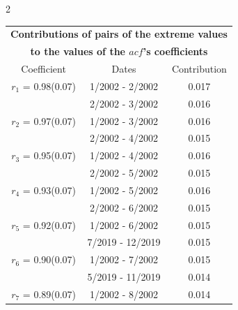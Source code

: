 
\thispagestyle{empty}
\begin{multicols}{2}{ 
\begin{tabular}{ccc}
\multicolumn{3}{c}{\textbf{Contributions of pairs of the extreme values} }  \vspace{-.10in}  \\ 
\multicolumn{3}{c}{ \textbf{to the values of the $acf$'s coefficients}} \\ 
\hline 
\hline                  Coefficient  &  Dates &  Contribution \\ 
\hline 
  $r_{ 1}$ = 0.98(0.07) &       1/2002 -  2/2002 &        0.017   \vspace{-.10in} \\  
&        2/2002 -  3/2002 &        0.016  \vspace{-.02in} \\ \hline 
  $r_{ 2}$ = 0.97(0.07) &       1/2002 -  3/2002 &        0.016   \vspace{-.10in} \\  
&        2/2002 -  4/2002 &        0.015  \vspace{-.02in} \\ \hline 
  $r_{ 3}$ = 0.95(0.07) &       1/2002 -  4/2002 &        0.016   \vspace{-.10in} \\  
&        2/2002 -  5/2002 &        0.015  \vspace{-.02in} \\ \hline 
  $r_{ 4}$ = 0.93(0.07) &       1/2002 -  5/2002 &        0.016   \vspace{-.10in} \\  
&        2/2002 -  6/2002 &        0.015  \vspace{-.02in} \\ \hline 
  $r_{ 5}$ = 0.92(0.07) &       1/2002 -  6/2002 &        0.015   \vspace{-.10in} \\  
&        7/2019 - 12/2019 &        0.015  \vspace{-.02in} \\ \hline 
  $r_{ 6}$ = 0.90(0.07) &       1/2002 -  7/2002 &        0.015   \vspace{-.10in} \\  
&        5/2019 - 11/2019 &        0.014  \vspace{-.02in} \\ \hline 
  $r_{ 7}$ = 0.89(0.07) &       1/2002 -  8/2002 &        0.014   \vspace{-.10in} \\  

\end{tabular}}
\end{multicols}
